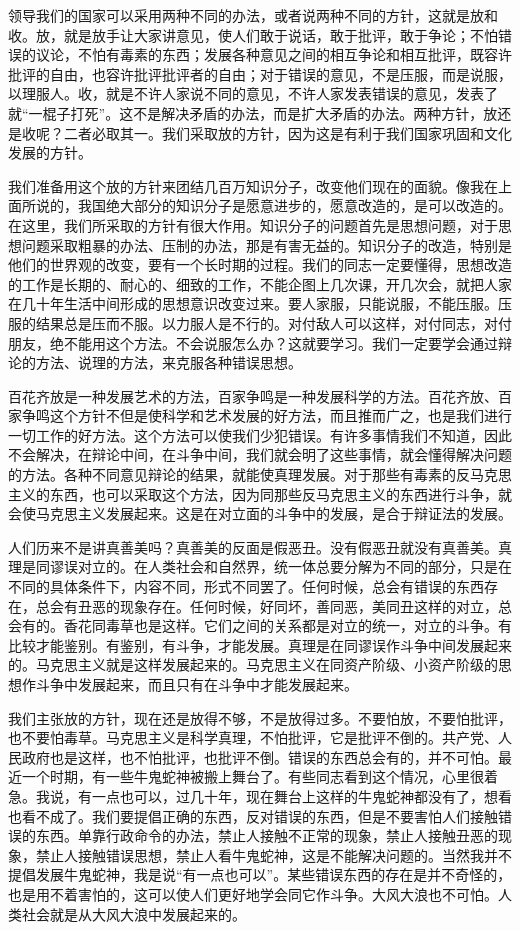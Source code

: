 领导我们的国家可以采用两种不同的办法，或者说两种不同的方针，这就是放和收。放，就是放手让大家讲意见，使人们敢于说话，敢于批评，敢于争论；不怕错误的议论，不怕有毒素的东西；发展各种意见之间的相互争论和相互批评，既容许批评的自由，也容许批评批评者的自由；对于错误的意见，不是压服，而是说服，以理服人。收，就是不许人家说不同的意见，不许人家发表错误的意见，发表了就“一棍子打死”。这不是解决矛盾的办法，而是扩大矛盾的办法。两种方针，放还是收呢？二者必取其一。我们采取放的方针，因为这是有利于我们国家巩固和文化发展的方针。

我们准备用这个放的方针来团结几百万知识分子，改变他们现在的面貌。像我在上面所说的，我国绝大部分的知识分子是愿意进步的，愿意改造的，是可以改造的。在这里，我们所采取的方针有很大作用。知识分子的问题首先是思想问题，对于思想问题采取粗暴的办法、压制的办法，那是有害无益的。知识分子的改造，特别是他们的世界观的改变，要有一个长时期的过程。我们的同志一定要懂得，思想改造的工作是长期的、耐心的、细致的工作，不能企图上几次课，开几次会，就把人家在几十年生活中间形成的思想意识改变过来。要人家服，只能说服，不能压服。压服的结果总是压而不服。以力服人是不行的。对付敌人可以这样，对付同志，对付朋友，绝不能用这个方法。不会说服怎么办？这就要学习。我们一定要学会通过辩论的方法、说理的方法，来克服各种错误思想。

百花齐放是一种发展艺术的方法，百家争鸣是一种发展科学的方法。百花齐放、百家争鸣这个方针不但是使科学和艺术发展的好方法，而且推而广之，也是我们进行一切工作的好方法。这个方法可以使我们少犯错误。有许多事情我们不知道，因此不会解决，在辩论中间，在斗争中间，我们就会明了这些事情，就会懂得解决问题的方法。各种不同意见辩论的结果，就能使真理发展。对于那些有毒素的反马克思主义的东西，也可以采取这个方法，因为同那些反马克思主义的东西进行斗争，就会使马克思主义发展起来。这是在对立面的斗争中的发展，是合于辩证法的发展。

人们历来不是讲真善美吗？真善美的反面是假恶丑。没有假恶丑就没有真善美。真理是同谬误对立的。在人类社会和自然界，统一体总要分解为不同的部分，只是在不同的具体条件下，内容不同，形式不同罢了。任何时候，总会有错误的东西存在，总会有丑恶的现象存在。任何时候，好同坏，善同恶，美同丑这样的对立，总会有的。香花同毒草也是这样。它们之间的关系都是对立的统一，对立的斗争。有比较才能鉴别。有鉴别，有斗争，才能发展。真理是在同谬误作斗争中间发展起来的。马克思主义就是这样发展起来的。马克思主义在同资产阶级、小资产阶级的思想作斗争中发展起来，而且只有在斗争中才能发展起来。

我们主张放的方针，现在还是放得不够，不是放得过多。不要怕放，不要怕批评，也不要怕毒草。马克思主义是科学真理，不怕批评，它是批评不倒的。共产党、人民政府也是这样，也不怕批评，也批评不倒。错误的东西总会有的，并不可怕。最近一个时期，有一些牛鬼蛇神被搬上舞台了。有些同志看到这个情况，心里很着急。我说，有一点也可以，过几十年，现在舞台上这样的牛鬼蛇神都没有了，想看也看不成了。我们要提倡正确的东西，反对错误的东西，但是不要害怕人们接触错误的东西。单靠行政命令的办法，禁止人接触不正常的现象，禁止人接触丑恶的现象，禁止人接触错误思想，禁止人看牛鬼蛇神，这是不能解决问题的。当然我并不提倡发展牛鬼蛇神，我是说“有一点也可以”。某些错误东西的存在是并不奇怪的，也是用不着害怕的，这可以使人们更好地学会同它作斗争。大风大浪也不可怕。人类社会就是从大风大浪中发展起来的。

